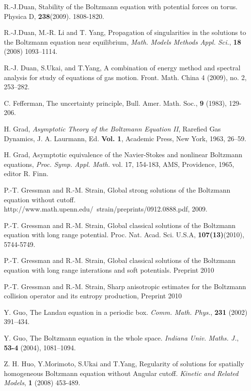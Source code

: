 \documentclass{amsart}[12pt, article]
\begin{document}
\begin{thebibliography}{99}
R.-J.Duan, Stability of the Boltzmann equation with potential forces on torus. Physica D,
{\bf 238}(2009). 1808-1820. 

 R.-J.Duan, M.-R. Li
and T. Yang, Propagation of singularities in the solutions to the
Boltzmann equation near equilibrium,  {\it Math. Models Methods Appl.
Sci.}, {\bf 18} (2008) 1093--1114.

R.-J. Duan, S.Ukai, and T.Yang, A combination of 
energy method and spectral analysis for study of equations of gas motion.  
Front. Math. China  4  (2009),  no. 2, 253--282.

C. Fefferman,
The uncertainty principle, Bull. Amer. Math. Soc.,
{\bf 9} (1983), 129-206.

H. Grad, {\it Asymptotic Theory of the Boltzmann Equation II}, Rarefied
Gas Dynamics, J. A. Laurmann, Ed. {\bf Vol. 1}, Academic Press,
New York, 1963, 26--59.

 H. Grad, Asymptotic equivalence of the Navier-Stokes and
nonlinear Boltzmann equations, {\it Proc. Symp. Appl. Math.} vol.
17,  154-183, AMS, Providence, 1965, editor R. Finn.

 P.-T. Gressman and R.-M. Strain, Global strong solutions of the Boltzmann equation without cutoff. http://www.math.upenn.edu/~strain/preprints/0912.0888.pdf, 2009.

 P.-T. Gressman and R.-M. Strain, Global classical solutions of the Boltzmann equation 
with long range potential. Proc. Nat. Acad. Sci. U.S.A, {\bf 107(13)}(2010), 5744-5749.

 P.-T. Gressman and R.-M. Strain, Global classical solutions of the Boltzmann equation 
with long range interations and soft potentials. Preprint 2010

 P.-T. Gressman and R.-M. Strain, Sharp anisotropic estimates for the Boltzmann collision operator and its entropy production, Preprint 2010

 Y. Guo, The Landau equation in a periodic box.
{\it Comm. Math. Phys.}, {\bf 231} (2002) 391--434.

 Y. Guo, The Boltzmann equation in the whole space. {\it Indiana Univ. Maths. J.}, {\bf 53-4} (2004), 1081--1094.

 Z. H. Huo, Y.Morimoto, S.Ukai and T.Yang, Regularity of
solutions for spatially homogeneous Boltzmann equation without
Angular cutoff. {\it Kinetic and Related Models}, {\bf 1} (2008)
453-489.


\end{thebibliography}
\end{document}
